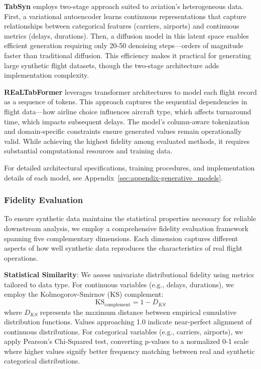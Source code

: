 \documentclass[conference]{IEEEtran}
\begin{document}
\textbf{TabSyn} \cite{zhang2024mixed} employs two-stage approach suited to aviation's heterogeneous data. First, a variational autoencoder learns continuous representations that capture relationships between categorical features (carriers, airports) and continuous metrics (delays, durations). Then, a diffusion model in this latent space enables efficient generation requiring only 20-50 denoising steps—orders of magnitude faster than traditional diffusion. This efficiency makes it practical for generating large synthetic flight datasets, though the two-stage architecture adds implementation complexity.

\textbf{REaLTabFormer} \cite{solatorio2023realtabformer} leverages transformer architectures to model each flight record as a sequence of tokens. This approach captures the sequential dependencies in flight data—how airline choice influences aircraft type, which affects turnaround time, which impacts subsequent delays. The model's column-aware tokenization and domain-specific constraints ensure generated values remain operationally valid. While achieving the highest fidelity among evaluated methods, it requires substantial computational resources and training data.

For detailed architectural specifications, training procedures, and implementation details of each model, see Appendix~\ref{sec:appendix-generative_models}.


\subsubsection{Fidelity Evaluation}

To ensure synthetic data maintains the statistical properties necessary for reliable downstream analysis, we employ a comprehensive fidelity evaluation framework spanning five complementary dimensions. Each dimension captures different aspects of how well synthetic data reproduces the characteristics of real flight operations.

\textbf{Statistical Similarity}:
We assess univariate distributional fidelity using metrics tailored to data type. For continuous variables (e.g., delays, durations), we employ the Kolmogorov-Smirnov (KS) complement:
\begin{equation}
\text{KS}_{\text{complement}} = 1 - D_{KS}
\end{equation}
where $D_{KS}$ represents the maximum distance between empirical cumulative distribution functions. Values approaching 1.0 indicate near-perfect alignment of continuous distributions. For categorical variables (e.g., carriers, airports), we apply Pearson's Chi-Squared test, converting p-values to a normalized 0-1 scale where higher values signify better frequency matching between real and synthetic categorical distributions.
\end{document}
